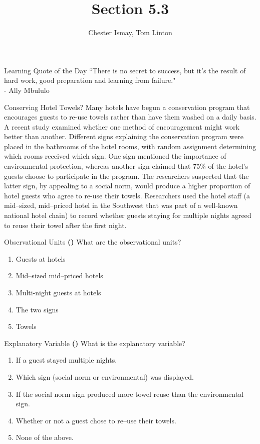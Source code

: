 \documentclass[13pt]{beamer}
\title{Section 5.3}
\author{Chester Ismay, Tom Linton}
\institute{Ripon College, Central College}
\date{}
\newcounter{count}
\newcommand{\quotes}[2]{\centering \Large{``#1"\\
\vspace*{0.2in}
\hspace*{0.5in} - #2}}
\newcommand{\question}{ \textbf{(\decimal{count})} \stepcounter{count}}
\newenvironment{click}{\begin{enumerate}[A]}{\end{enumerate}}
\begin{document}
\begin{frame}
  \titlepage
\end{frame}


\begin{frame}{Learning Quote of the Day}
\quotes{There is no secret to success, but it's the result of hard work, good preparation and learning from failure.}{Ally Mbululo}
\end{frame}

\begin{frame}{Conserving Hotel Towels?}
Many hotels have begun a
conservation program that encourages guests to re-use towels rather than
have them washed on a daily basis. A recent study examined whether one
method of encouragement might work better than another. Different signs
explaining the conservation program were placed in the bathrooms of the
hotel rooms, with random assignment determining which rooms received which
sign. One sign mentioned the importance of environmental protection, whereas
another sign claimed that 75\% of the hotel's guests choose to participate
in the program. The researchers suspected that the latter sign, by appealing
to a social norm, would produce a higher proportion of hotel guests who
agree to re-use their towels. Researchers used the hotel staff (a mid--sized,
mid--priced hotel in the Southwest that was part of a well-known national
hotel chain) to record whether guests staying for multiple nights agreed to
reuse their towel after the first night.
\end{frame}

\begin{frame}{Observational Units}
\question What are the observational units?
\begin{click}
   \item Guests at hotels
   \item Mid--sized mid--priced hotels
   \item Multi-night guests at hotels%
   \item The two signs
   \item Towels
\end{click}
\end{frame}

\begin{frame}{Explanatory Variable}
\question What is the explanatory variable?
\begin{click}
   \item If a guest stayed multiple nights.
   \item Which sign (social norm or environmental) was displayed.%
   \item If the social norm sign produced more towel reuse than the environmental sign.
   \item Whether or not a guest chose to re--use their towels.
   \item None of the above.
\end{click}
\end{frame}
\end{document}
